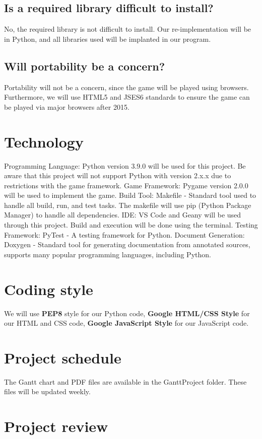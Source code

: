 \documentclass{article}
\begin{document}
\subsection{Is a required library difficult to install?}
No, the required library is not difficult to install. Our re-implementation will be in Python, and all libraries used will be implanted in our program.

\subsection{Will portability be a concern?}
Portability will not be a concern, since the game will be played using browsers. Furthermore, we will use HTML5 and JSES6 standards to ensure the game can be played via major browsers after 2015.


\section{Technology}
Programming Language: Python version 3.9.0 will be used for this project. Be aware that this project will not support Python with version 2.x.x due to restrictions with the game framework.
Game Framework: Pygame version 2.0.0 will be used to implement the game.
Build Tool: Makefile - Standard tool used to handle all build, run, and test tasks. The makefile will use pip (Python Package Manager) to handle all dependencies.
IDE: VS Code and Geany will be used through this project. Build and execution will be done using the terminal.
Testing Framework: PyTest - A testing framework for Python.
Document Generation: Doxygen - Standard tool for generating documentation from annotated sources, supports many popular programming languages, including Python.


\section{Coding style}
We will use \textbf{PEP8} style for our Python code, \textbf{Google HTML/CSS Style} for our HTML and CSS code, \textbf{Google JavaScript Style} for our JavaScript code.

\section{Project schedule}
The Gantt chart and PDF files are available in the GanttProject folder. These files will be updated weekly.

\section{Project review}
\end{document}
